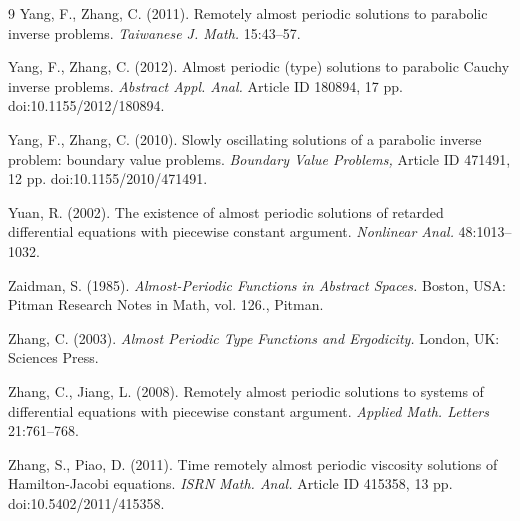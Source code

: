 \documentclass[english,reqno]{amsart}
\numberwithin{equation}{section}
\theoremstyle{plain}
\theoremstyle{definition}
\theoremstyle{remark}
\begin{document}
\begin{thebibliography}{9}
Yang, F., Zhang, C. (2011).
Remotely almost periodic solutions to parabolic inverse problems.
{\it Taiwanese J. Math.} 15:43--57.

Yang, F., Zhang, C. (2012).
Almost periodic (type) solutions to
parabolic Cauchy inverse problems.
{\it Abstract Appl. Anal.} Article ID 180894, 17 pp.
doi:10.1155/2012/180894.

Yang, F., Zhang, C. (2010).
Slowly oscillating solutions of a parabolic inverse
problem: boundary value problems.
{\it Boundary Value Problems,} Article ID 471491, 12 pp.
doi:10.1155/2010/471491.

Yuan, R. (2002).
The existence of almost periodic solutions of retarded differential equations
with piecewise constant argument.
{\it Nonlinear Anal.} 48:1013--1032.

Zaidman, S. (1985).
{\it Almost-Periodic Functions in Abstract Spaces.} Boston, USA:
Pitman Research Notes in
Math, vol. 126., Pitman.

Zhang, C. (2003).
{\it Almost Periodic Type Functions and Ergodicity.}
London, UK:
Sciences Press.

Zhang, C., Jiang, L. (2008).
Remotely almost periodic solutions to systems of differential equations with
piecewise constant argument.
{\it Applied Math. Letters} 21:761--768.

Zhang, S., Piao, D. (2011).
Time remotely almost periodic viscosity solutions
of Hamilton-Jacobi equations.
{\it ISRN Math. Anal.} Article ID 415358, 13 pp.
doi:10.5402/2011/415358.





\end{thebibliography}
\end{document}
